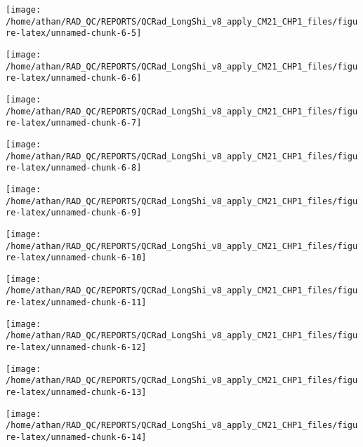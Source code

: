 \documentclass[
  10pt,
  a4paper,oneside]{article}
\begin{document}
\begin{center}\texttt{[image: /home/athan/RAD\_QC/REPORTS/QCRad\_LongShi\_v8\_apply\_CM21\_CHP1\_files/figure-latex/unnamed-chunk-6-5]} \end{center}

\begin{center}\texttt{[image: /home/athan/RAD\_QC/REPORTS/QCRad\_LongShi\_v8\_apply\_CM21\_CHP1\_files/figure-latex/unnamed-chunk-6-6]} \end{center}

\begin{center}\texttt{[image: /home/athan/RAD\_QC/REPORTS/QCRad\_LongShi\_v8\_apply\_CM21\_CHP1\_files/figure-latex/unnamed-chunk-6-7]} \end{center}

\begin{center}\texttt{[image: /home/athan/RAD\_QC/REPORTS/QCRad\_LongShi\_v8\_apply\_CM21\_CHP1\_files/figure-latex/unnamed-chunk-6-8]} \end{center}

\begin{center}\texttt{[image: /home/athan/RAD\_QC/REPORTS/QCRad\_LongShi\_v8\_apply\_CM21\_CHP1\_files/figure-latex/unnamed-chunk-6-9]} \end{center}

\begin{center}\texttt{[image: /home/athan/RAD\_QC/REPORTS/QCRad\_LongShi\_v8\_apply\_CM21\_CHP1\_files/figure-latex/unnamed-chunk-6-10]} \end{center}

\begin{center}\texttt{[image: /home/athan/RAD\_QC/REPORTS/QCRad\_LongShi\_v8\_apply\_CM21\_CHP1\_files/figure-latex/unnamed-chunk-6-11]} \end{center}

\begin{center}\texttt{[image: /home/athan/RAD\_QC/REPORTS/QCRad\_LongShi\_v8\_apply\_CM21\_CHP1\_files/figure-latex/unnamed-chunk-6-12]} \end{center}

\begin{center}\texttt{[image: /home/athan/RAD\_QC/REPORTS/QCRad\_LongShi\_v8\_apply\_CM21\_CHP1\_files/figure-latex/unnamed-chunk-6-13]} \end{center}

\begin{center}\texttt{[image: /home/athan/RAD\_QC/REPORTS/QCRad\_LongShi\_v8\_apply\_CM21\_CHP1\_files/figure-latex/unnamed-chunk-6-14]} \end{center}
\end{document}
